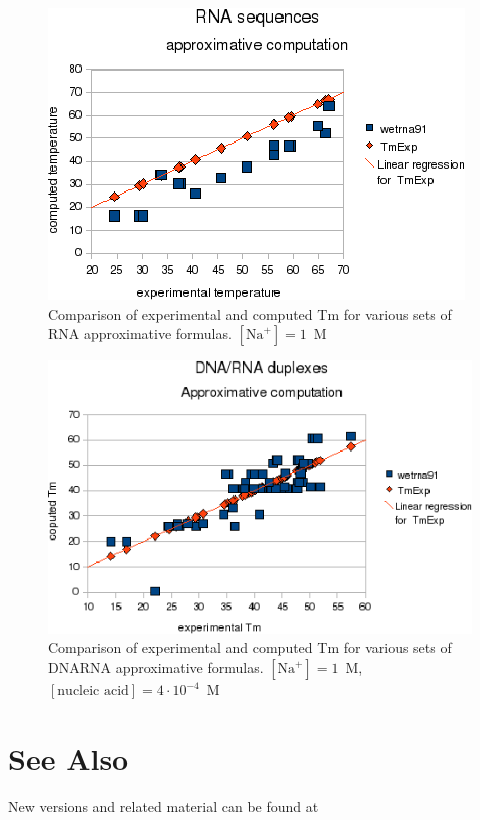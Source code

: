 \documentclass{article}
\begin{document}
\begin{figure}[h]
\includegraphics[width=1\linewidth]{images/RNAApproximativeMode}
\caption{Comparison of experimental and computed Tm for various sets of
 RNA approximative formulas. $[\mbox{Na}^+] = 1$~M}
\end{figure}

\begin{figure}[h]
\includegraphics[width=1\linewidth]{images/DNARNAApproximativeMode}
\caption{Comparison of experimental and computed Tm for various sets of
 DNARNA approximative formulas. $[\mbox{Na}^+] = 1$~M, $[\mbox{nucleic acid}] = 4\cdot{}10^{-4}$~M}
\end{figure}      
 
\clearpage

  
 
\section{See Also }
New versions and 
related material can be found at 
\end{document}
